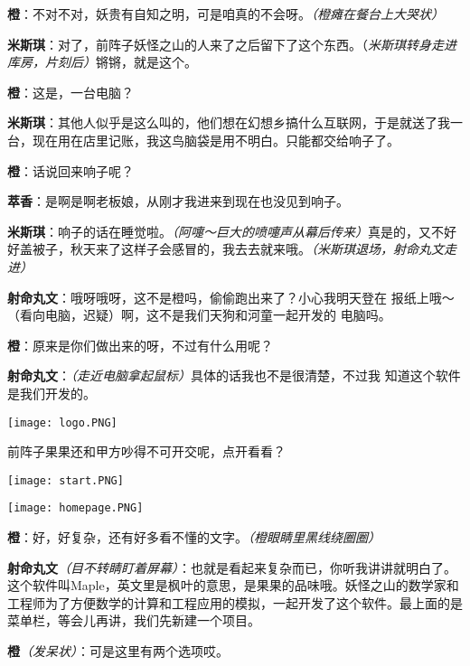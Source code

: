 \begin{multicols}{2}
    \textbf{橙}：不对不对，妖贵有自知之明，可是咱真的不会呀。\textit{（橙瘫在餐台上大哭状）}

    \textbf{米斯琪}：对了，前阵子妖怪之山的人来了之后留下了这个东西。（\textit{米斯琪转身走进库房，片刻后）}锵锵，就是这个。

    \textbf{橙}：这是，一台电脑？

    \textbf{米斯琪}：其他人似乎是这么叫的，他们想在幻想乡搞什么互联网，于是就送了我一台，现在用在店里记账，我这鸟脑袋是用不明白。只能都交给响子了。

    \textbf{橙}：话说回来响子呢？

    \textbf{萃香}：是啊是啊老板娘，从刚才我进来到现在也没见到响子。

    \textbf{米斯琪}：响子的话在睡觉啦。\textit{（阿嚏～巨大的喷嚏声从幕后传来）}真是的，又不好好盖被子，秋天来了这样子会感冒的，我去去就来哦。\textit{（米斯琪退场，射命丸文走进）}

    \textbf{射命丸文}：哦呀哦呀，这不是橙吗，偷偷跑出来了？小心我明天登在
    报纸上哦～（看向电脑，迟疑）啊，这不是我们天狗和河童一起开发的
    电脑吗。

    \textbf{橙}：原来是你们做出来的呀，不过有什么用呢？



    \textbf{射命丸文}：\textit{（走近电脑拿起鼠标）}具体的话我也不是很清楚，不过我
    知道这个软件是我们开发的。
    \begin{center}
        \texttt{[image: logo.PNG]}
    \end{center}
    前阵子果果还和甲方吵得不可开交呢，点开看看？

    \begin{center}
        \texttt{[image: start.PNG]}
    \end{center}

    \begin{center}
        \texttt{[image: homepage.PNG]}
    \end{center}

    \textbf{橙}：好，好复杂，还有好多看不懂的文字。\textit{（橙眼睛里黑线绕圈圈）}

    \textbf{射命丸文}\textit{（目不转睛盯着屏幕）}：也就是看起来复杂而已，你听我讲讲就明白了。这个软件叫Maple，英文里是枫叶的意思，是果果的品味哦。妖怪之山的数学家和工程师为了方便数学的计算和工程应用的模拟，一起开发了这个软件。最上面的是菜单栏，等会儿再讲，我们先新建一个项目。

    \textbf{橙}\textit{（发呆状）}：可是这里有两个选项哎。


\end{multicols}
